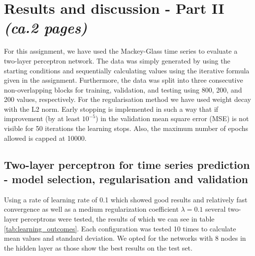 \documentclass[a4paper]{article}
\begin{document}
\pagebreak
\section{Results and discussion - Part II \textit{(ca.2 pages)}}


For this assignment, we have used the Mackey-Glass time series to evaluate a two-layer perceptron network. The data was simply generated by using the starting conditions and sequentially calculating values using the iterative formula given in the assignment. Furthermore, the data was split into three consecutive non-overlapping blocks for training, validation, and testing using 800, 200, and 200 values, respectively. For the regularisation method we have used weight decay with the L2 norm. Early stopping is implemented in such a way that if improvement (by at least $10^{-5}$) in the validation mean square error (MSE) is not visible for 50 iterations the learning stops. Also, the maximum number of epochs allowed is capped at 10000.

\subsection{Two-layer perceptron for time series prediction - model selection, regularisation and validation}
Using a rate of learning rate of 0.1 which showed good results and relatively fast convergence as well as a medium regularization coefficient $\lambda = 0.1$ several two-layer perceptrons were tested, the results of which we can see in table \ref{tab:learning_outcomes}. Each configuration was tested 10 times to calculate mean values and standard deviation. We opted for the networks with 8 nodes in the hidden layer as those show the best results on the test set.
\end{document}
